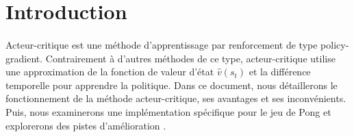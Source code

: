 \vspace{-0.4cm}
\section{Introduction}

\paragraph{}
Acteur-critique est une méthode d'apprentissage par renforcement de type policy-gradient.
Contrairement à d'autres méthodes de ce type, acteur-critique utilise 
une approximation de la fonction de valeur d'état $\hat{v}(s_t)$ et la différence temporelle
pour apprendre la politique. Dans ce document,
nous détaillerons le fonctionnement de la méthode acteur-critique,
ses avantages et ses inconvénients. Puis,
nous examinerons une implémentation spécifique pour le jeu de Pong et explorerons des pistes d'amélioration \cite{PongGithub}.
